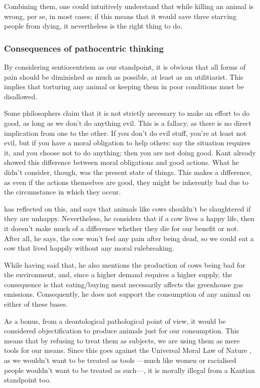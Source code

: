 \documentclass{article}
\begin{document}
		Combining them, one could intuitively understand that while killing an animal is wrong, per se, in most cases; if this means that it would save three starving people from dying, it nevertheless is the right thing to do.

		\subsubsection*{Consequences of pathocentric thinking}

		By considering sentiocentrism as our standpoint, it is obvious that all forms of pain should be diminished as much as possible, at least as an utilitiarist. This implies that torturing any animal or keeping them in poor conditions must be disallowed. 

		Some philosophers claim that it is not strictly necessary to make an effort to do good, as long as we don't do anything evil. This is a fallacy, as there is no direct implication from one to the other. If you don't do evil stuff, you're at least not evil, but if you have a moral obligation to help others: say the situation requires it, and you choose not to do anything; then you are not doing good. Kant already showed this difference between moral obligations and good actions. What he didn't consider, though, was the present state of things. This makes a difference, as even if the actions themselves are good, they might be inherently bad due to the circumstance in which they occur.

		\citet{singeryoutube} has reflected on this, and says that animals like cows shouldn't be slaughtered if they are unhappy. Nevertheless, he considers that if a cow lives a happy life, then it doesn't make much of a difference whether they die for our benefit or not. After all, he says, the cow won't feel any pain after being dead, so we could eat a cow that lived happily without any moral rulebreaking.

		While having said that, he also mentions the production of cows being bad for the environment, and, since a higher demand requires a higher supply, the consequence is that eating/buying meat necessarily affects the greenhouse gas emissions. Consequently, he does not support the consumption of any animal on either of these bases.

		As a bonus, from a deontological pathological point of view, it would be considered objectification to produce animals just for our consumption. This means that by refusing to treat them as subjects, we are using them as mere tools for our means. Since this goes against the Universal Moral Law of Nature \autocite{universallaw}, as we wouldn't want to be treated as tools ---much like women or racialised people wouldn't want to be treated as such---, it is morally illegal from a Kantian standpoint too.

 	\printbibliography
\end{document}
